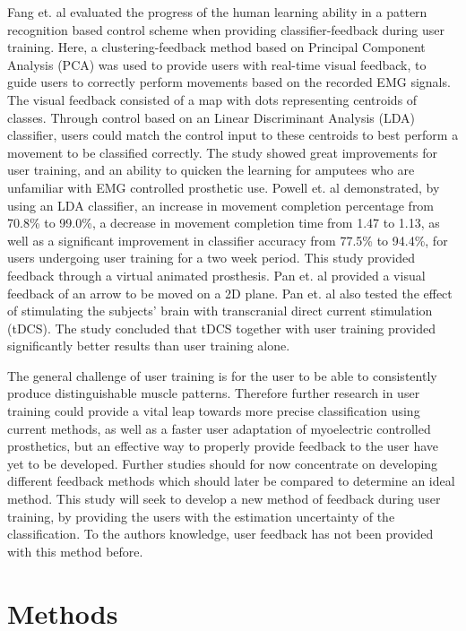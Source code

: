 Fang et. al \cite{Fang2017} evaluated the progress of the human learning ability in a pattern recognition based control scheme when providing classifier-feedback during user training. Here, a clustering-feedback method based on Principal Component Analysis (PCA) was used to provide users with real-time visual feedback, to guide users to correctly perform movements based on the recorded EMG signals. The visual feedback consisted of a map with dots representing centroids of classes. Through control based on an Linear Discriminant Analysis (LDA) classifier, users could match the control input to these centroids to best perform a movement to be classified correctly. The study showed great improvements for user training, and an ability to quicken the learning for amputees who are unfamiliar with EMG controlled prosthetic use. \cite{Fang2017}
Powell et. al \cite{Powell2014} demonstrated, by using an LDA classifier, an increase in movement completion percentage from 70.8\% to 99.0\%, a decrease in movement completion time from 1.47 to 1.13, as well as a significant improvement in classifier accuracy from 77.5\% to 94.4\%, for users undergoing user training for a two week period. This study provided feedback through a virtual animated prosthesis.
Pan et. al \cite{Pan2017} provided a visual feedback of an arrow to be moved on a 2D plane. Pan et. al also tested the effect of stimulating the subjects’ brain with transcranial direct current stimulation (tDCS). The study concluded that tDCS together with user training provided significantly better results than user training alone. \cite{Pan2017}

The general challenge of user training is for the user to be able to consistently produce distinguishable muscle patterns. \cite{Powell2014} Therefore further research in user training could provide a vital leap towards more precise classification using current methods, as well as a faster user adaptation of myoelectric controlled prosthetics, but an effective way to properly provide feedback to the user have yet to be developed. 
Further studies should for now concentrate on developing different feedback methods which should later be compared to determine an ideal method. 
This study will seek to develop a new method of feedback during user training, by providing the users with the estimation uncertainty of the classification. To the authors knowledge, user feedback has not been provided with this method before.

\section*{Methods}


